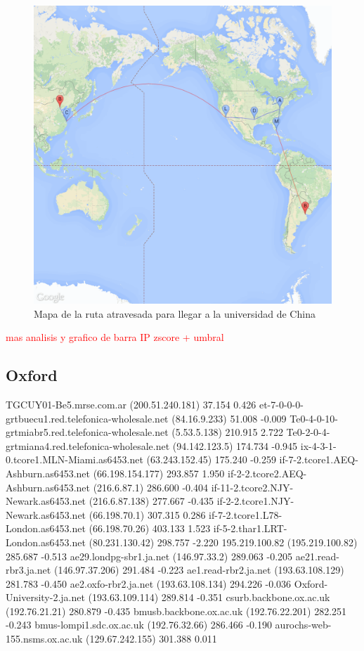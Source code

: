 \begin{figure}[H]
	\begin{center}
		  \includegraphics[scale=0.4]{../results/maps/Tsinghua.png}
		  \caption{Mapa de la ruta atravesada para llegar a la universidad de China}
	\end{center}
\end{figure}

\textcolor{red}{mas analisis y grafico de barra IP zscore + umbral}

\subsection{Oxford}

TGCUY01-Be5.mrse.com.ar	(200.51.240.181)	37.154	0.426
et-7-0-0-0-grtbuecu1.red.telefonica-wholesale.net	(84.16.9.233)	51.008	-0.009
Te0-4-0-10-grtmiabr5.red.telefonica-wholesale.net	(5.53.5.138)	210.915	2.722
Te0-2-0-4-grtmiana4.red.telefonica-wholesale.net	(94.142.123.5)	174.734	-0.945
ix-4-3-1-0.tcore1.MLN-Miami.as6453.net	(63.243.152.45)	175.240	-0.259
if-7-2.tcore1.AEQ-Ashburn.as6453.net	(66.198.154.177)	293.857	1.950
if-2-2.tcore2.AEQ-Ashburn.as6453.net	(216.6.87.1)	286.600	-0.404
if-11-2.tcore2.NJY-Newark.as6453.net	(216.6.87.138)	277.667	-0.435
if-2-2.tcore1.NJY-Newark.as6453.net	(66.198.70.1)	307.315	0.286
if-7-2.tcore1.L78-London.as6453.net	(66.198.70.26)	403.133	1.523
if-5-2.thar1.LRT-London.as6453.net	(80.231.130.42)	298.757	-2.220
195.219.100.82	(195.219.100.82)	285.687	-0.513
ae29.londpg-sbr1.ja.net	(146.97.33.2)	289.063	-0.205
ae21.read-rbr3.ja.net	(146.97.37.206)	291.484	-0.223
ae1.read-rbr2.ja.net	(193.63.108.129)	281.783	-0.450
ae2.oxfo-rbr2.ja.net	(193.63.108.134)	294.226	-0.036
Oxford-University-2.ja.net	(193.63.109.114)	289.814	-0.351
csurb.backbone.ox.ac.uk	(192.76.21.21)	280.879	-0.435
bmusb.backbone.ox.ac.uk	(192.76.22.201)	282.251	-0.243
bmus-lompi1.sdc.ox.ac.uk	(192.76.32.66)	286.466	-0.190
aurochs-web-155.nsms.ox.ac.uk	(129.67.242.155)	301.388	0.011

